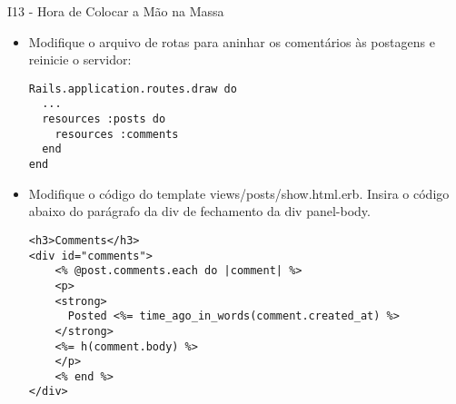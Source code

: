 \begin{frame}{I13 - Hora de Colocar a Mão na Massa}
	\begin{itemize}
		\item Modifique o arquivo de rotas para aninhar os comentários às postagens e reinicie o servidor:
		\begin{lstlisting}[style=RubyInputStyle, caption=config/routes.rb]
Rails.application.routes.draw do
  ...
  resources :posts do 
    resources :comments
  end 
end 
		\end{lstlisting}

%		
		
%				
				
		\item Modifique o código do template \alert{views/posts/show.html.erb}. Insira o código abaixo do parágrafo da div de fechamento da div panel-body.
		\begin{lstlisting}[style=RubyInputStyle]
<h3>Comments</h3>
<div id="comments">
    <% @post.comments.each do |comment| %>
    <p>
    <strong>
      Posted <%= time_ago_in_words(comment.created_at) %>
    </strong>
    <%= h(comment.body) %>
    </p>
    <% end %>
</div>		
\end{lstlisting}


\end{itemize}
\end{frame}
